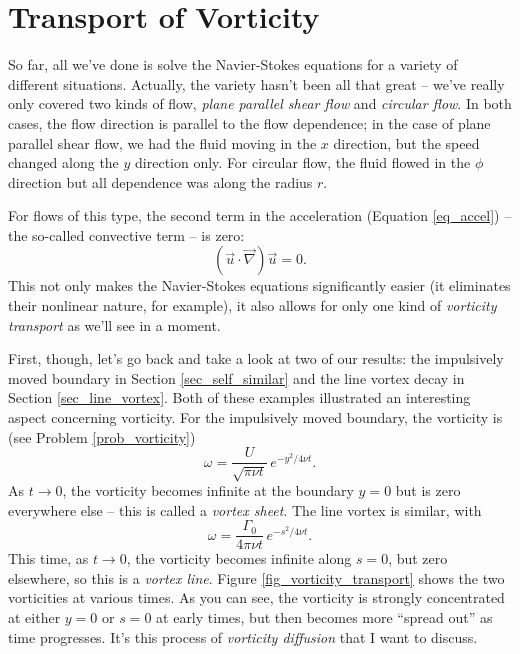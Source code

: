 %
% 

\section{Transport of Vorticity}

So far, all we've done is solve the Navier-Stokes equations for a variety of different situations.  Actually, the variety hasn't been all that great -- we've really only covered two kinds of flow, \emph{plane parallel shear flow} and \emph{circular flow}.  In both cases, the flow direction is parallel to the flow dependence; in the case of plane parallel shear flow, we had the fluid moving in the $x$ direction, but the speed changed along the $y$ direction only.  For circular flow, the fluid flowed in the $\phi$ direction but all dependence was along the radius $r$.  

For flows of this type, the second term in the acceleration (Equation \ref{eq_accel}) -- the so-called convective term -- is zero:
\[
(\vec{u} \cdot \vec{\nabla}) \vec{u} = 0.
\]
This not only makes the Navier-Stokes equations significantly easier (it eliminates their nonlinear nature, for example), it also allows for only one kind of \emph{vorticity transport} as we'll see in a moment.

First, though, let's go back and take a look at two of our results:  the impulsively moved boundary in Section \ref{sec_self_similar} and the line vortex decay in Section \ref{sec_line_vortex}.  Both of these examples illustrated an interesting aspect concerning vorticity.  For the impulsively moved boundary, the vorticity is (see Problem \ref{prob_vorticity})
\begin{equation}
\label{eq_vort_1}
\omega = \frac{U}{\sqrt{\pi \nu t}} \, e^{-y^2 / 4 \nu t}.
\end{equation}
As $t \to 0$, the vorticity becomes infinite at the boundary $y=0$ but is zero everywhere else -- this is called a \emph{vortex sheet}.  The line vortex is similar, with 
\begin{equation}
\label{eq_vort_2}
\omega = \frac{\Gamma_0}{4\pi \nu t} \, e^{-s^2 / 4 \nu t}.
\end{equation}
This time, as $t \to 0$, the vorticity becomes infinite along $s=0$, but zero elsewhere, so this is a \emph{vortex line}.  Figure \ref{fig_vorticity_transport} shows the two vorticities at various times.  As you can see, the vorticity is strongly concentrated at either $y=0$ or $s=0$ at early times, but then becomes more ``spread out'' as time progresses.  It's this process of \emph{vorticity diffusion} that I want to discuss.

